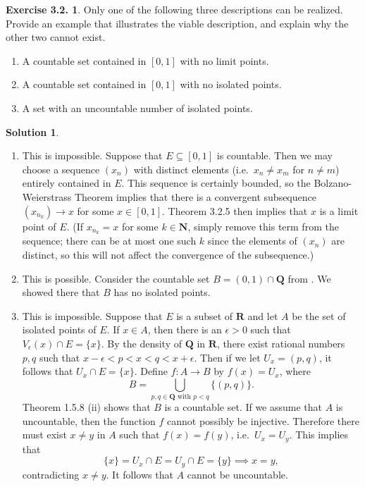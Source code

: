 \documentclass[12pt]{article}
\theoremstyle{definition}
\theoremstyle{exercise}
\newtheorem{exercise}{Exercise 3.2.}
\theoremstyle{solution}
\newtheorem*{solution}{Solution}
\newcommand{\N}{\mathbf{N}}
\newcommand{\Q}{\mathbf{Q}}
\newcommand{\R}{\mathbf{R}}
\begin{document}
\begin{exercise}
\label{ex:10}
    Only one of the following three descriptions can be realized. Provide an example that illustrates the viable description, and explain why the other two cannot exist.
    \begin{enumerate}
        \item A countable set contained in \( [0, 1] \) with no limit points.

        \item A countable set contained in \( [0, 1] \) with no isolated points.

        \item A set with an uncountable number of isolated points.
    \end{enumerate}
\end{exercise}

\begin{solution}
    \begin{enumerate}
        \item This is impossible. Suppose that \( E \subseteq [0, 1] \) is countable. Then we may choose a sequence \( (x_n) \) with distinct elements (i.e.\ \( x_n \neq x_m \) for \( n \neq m \)) entirely contained in \( E \). This sequence is certainly bounded, so the Bolzano-Weierstrass Theorem implies that there is a convergent subsequence \( (x_{n_k}) \to x \) for some \( x \in [0, 1] \). Theorem 3.2.5 then implies that \( x \) is a limit point of \( E \). (If \( x_{n_k} = x \) for some \( k \in \N \), simply remove this term from the sequence; there can be at most one such \( k \) since the elements of \( (x_n) \) are distinct, so this will not affect the convergence of the subsequence.)

        \item This is possible. Consider the countable set \( B = (0, 1) \cap \Q \) from . We showed there that \( B \) has no isolated points.

        \item This is impossible. Suppose that \( E \) is a subset of \( \R \) and let \( A \) be the set of isolated points of \( E \). If \( x \in A \), then there is an \( \epsilon > 0 \) such that \( V_{\epsilon}(x) \cap E = \{ x \} \). By the density of \( \Q \) in \( \R \), there exist rational numbers \( p, q \) such that \( x - \epsilon < p < x < q < x + \epsilon \). Then if we let \( U_x = (p, q) \), it follows that \( U_x \cap E = \{ x \} \). Define \( f : A \to B \) by \( f(x) = U_x \), where
        \[
            B = \bigcup_{p, q \in \Q \text{ with } p < q} \{ (p, q) \}.
        \]
        Theorem 1.5.8 (ii) shows that \( B \) is a countable set. If we assume that \( A \) is uncountable, then the function \( f \) cannot possibly be injective. Therefore there must exist \( x \neq y \) in \( A \) such that \( f(x) = f(y) \), i.e.\ \( U_x = U_y \). This implies that
        \[
            \{ x \} = U_x \cap E = U_y \cap E = \{ y \} \implies x = y,
        \]
        contradicting \( x \neq y \). It follows that \( A \) cannot be uncountable.
    \end{enumerate}
\end{solution}
\end{document}
